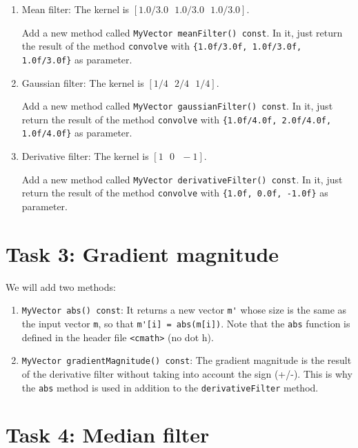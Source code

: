 \documentclass[english,a4paper,12pt,oneside]{article}
\begin{document}
\begin{enumerate}
\item Mean filter: The kernel is $\left[1.0/3.0~~~1.0/3.0~~~1.0/3.0\right]$.

Add a new method called \verb+MyVector meanFilter() const+. 
In it, just return the result of the method \verb+convolve+ with 
\verb+{1.0f/3.0f, 1.0f/3.0f, 1.0f/3.0f}+ as parameter.

\item Gaussian filter: The kernel is $\left[1/4~~~2/4~~~1/4\right]$. 

Add a new method called \verb+MyVector gaussianFilter() const+. 
In it, just return the result of the method \verb+convolve+ with \verb+{1.0f/4.0f, 2.0f/4.0f, 1.0f/4.0f}+ as parameter.

\item Derivative filter: The kernel is $\left[1~~~0~~~-1\right]$. 

Add a new method called \verb+MyVector derivativeFilter() const+. 
In it, just return the result of the method \verb+convolve+ with \verb+{1.0f, 0.0f, -1.0f}+ as parameter.

\end{enumerate}

\section*{Task 3: Gradient magnitude}

We will add two methods:
\begin{enumerate}
\item \verb+MyVector abs() const+: 
It returns a new vector \verb+m'+ whose size is the same as the input vector \verb+m+, so that \verb+m'[i] = abs(m[i])+. Note that the \verb+abs+ function is defined in the header file \verb+<cmath>+ (no dot h).



\item \verb+MyVector gradientMagnitude() const+: 
The gradient magnitude is the result of the derivative filter without taking into account the sign (+/-). This is why the \verb+abs+ method is used in addition to the \verb+derivativeFilter+ method.


\end{enumerate}


\section*{Task 4: Median filter}
\end{document}
